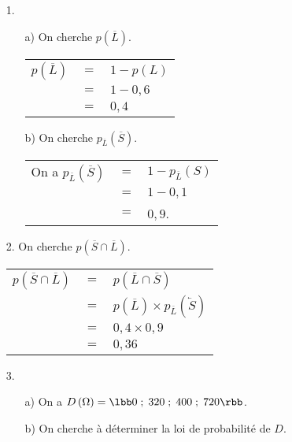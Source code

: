 \begin{itemize}
\item[1.]
\begin{itemize}
\item[a)] On cherche $p\left(\overline{L}\right)$. \\

\begin{tabular}{lll}
\hspace*{-.3cm} $p\left(\overline{L}\right)$ & $=$ & $1 - p\left(L\right)$ \\
& $=$ & $1 - 0,6$ \\
& $=$ & $0,4$ \\
\end{tabular}

\vspace*{.3cm}

\item[b)] On cherche $p_{\overline{L}}\left(\overline{S}\right)$. \\

\begin{tabular}{lll}
On a $p_{\overline{L}}\left(\overline{S}\right)$ & $=$ & $1 - p_{\overline{L}}\left(S\right)$ \\
& $=$ & $1 - 0,1$ \\
& $=$ & $0,9$. 
\end{tabular}
\end{itemize}

\vspace*{-5cm}

\newpage

\item[2.] On cherche $p\left(\overline{S} \cap \overline{L}\right)$. \\

\begin{tabular}{lll}
$p\left(\overline{S} \cap \overline{L}\right)$ & $=$ & $p\left(\overline{L} \cap \overline{S}\right)$ \\
& $=$ & $p\left(\overline{L}\right) \times p_{\overline{L}}\left(\overleftarrow{S}\right)$ \\
& $=$ & $0,4 \times 0,9$ \\
& $=$ & $0,36$ \\
\end{tabular}

\vspace*{.3cm}

\item[3.]
\begin{itemize}
\item[a)] On a $D\left(\Omega\right) = \lbb 0 \; ; \; 320 \; ; \; 400 \; ; \; 720 \rbb$. \\
\item[b)] On cherche à déterminer la loi de probabilité de $D$. \\


\end{itemize}
\end{itemize}
